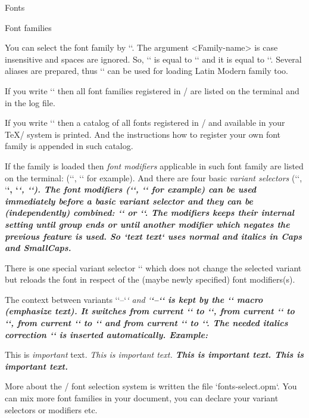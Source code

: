 \sec Fonts

\secc Font families

You can select the font family by ``.
The argument <Family-name> is case insensitive and spaces are ignored. So,
`\fontfam[LM Fonts]` is equal to `\fontfam[LMfonts]` and it is equal
to `\fontfam[lmfonts]`. Several aliases are prepared, thus 
`` can be used for loading Latin Modern family too.

If you write `\fontfam[?]` then all font families registered in \OpTeX/ 
are listed on the terminal and in the log file.

If you write `\fontfam[catalog]` then a catalog of all fonts registered in
\OpTeX/ and available in your \TeX/ system is printed. And the instructions
how to register your own font family is appended in such catalog.

If the family is loaded then {\em font modifiers} applicable in such font family
are listed on the terminal: (`\caps`, `\cond` for example).
And there are four basic {\em variant selectors} (`\rm`, `\bf`, `\it`, `\bi`).
The font modifiers (`\caps`, `\cond` for example) can
be used immediately before a basic variant selector and they
can be (independently) combined: `\caps\it` or `\cond\caps\bf`. The
modifiers keeps their internal setting until group ends or until another
modifier which negates the previous feature is used. So
`\caps \rm text \it text`  uses normal and italics in Caps and SmallCaps.

\new
There is one special variant selector `\currvar` which does not change the
selected variant but reloads the font in respect of the (maybe newly
specified) font modifiers(s).

The context between variants `\rm`--`\it` and `\bf`--`\bi` is kept by the `\em`
macro (emphasize text).  
It switches from current `\rm` to `\it`, from current `\it` to `\rm`, from
current `\bf` to `\bi` and from current `\bi` to `\bf`.
The needed italics correction `\/` is inserted automatically. Example:

\begtt
This is {\em important} text.     %
\it This is {\em important} text. %
\bf This is {\em important} text. %
\bi This is {\em important} text. %
\endtt

\new
More about the \OpTeX/ font selection system is written the file
`fonts-select.opm`. You can mix more font families in your document, you can
declare your variant selectors or modifiers etc.

